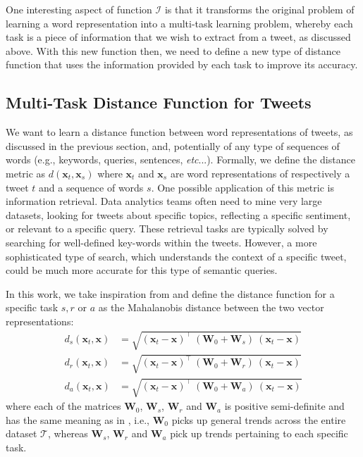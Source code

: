 \documentclass[letterpaper]{article}
\begin{document}
One interesting aspect of function $\mathcal{I}$ is that it transforms the original problem of learning a word representation into a multi-task learning problem, whereby each task is a piece of information that we wish to extract from a tweet, as discussed above. With this new function then, we need to define a new type of distance function that uses the information provided by each task to improve its accuracy.  

\subsection{Multi-Task Distance Function for Tweets}

We want to learn a distance function between word representations of tweets, as discussed in the previous section, and, potentially of any type of sequences of words (e.g., keywords, queries, sentences, \emph{etc}...). Formally, we define the distance metric as $d(\mathbf{x}_t, \mathbf{x}_s)$ where $\mathbf{x}_t$ and $\mathbf{x}_s$ are word representations of respectively a tweet $t$ and a sequence of words $s$. One possible application of this metric is information retrieval. Data analytics teams often need to mine very large datasets, looking for tweets about specific topics, reflecting a specific sentiment, or relevant to a specific query. These retrieval tasks are typically solved by searching for well-defined key-words within the tweets. However, a more sophisticated type of search, which understands the context of a specific tweet, could be much more accurate for this 
type of semantic queries. 

In this work, we take inspiration from \cite{Parameswaran2010a} and define the distance function for a specific task $s, r$ or $a$ as the Mahalanobis distance between the two vector representations: 
\begin{align}
d_{s} (\mathbf{x}_t, \mathbf{x}) &= \sqrt{  (\mathbf{x}_t - \mathbf{x})^{\intercal}\ (\mathbf{W}_0 + \mathbf{W}_s)\ (\mathbf{x}_t - \mathbf{x})}\label{eq:dist-1}\\
d_{r} (\mathbf{x}_t, \mathbf{x}) &= \sqrt{  (\mathbf{x}_t - \mathbf{x})^{\intercal}\ (\mathbf{W}_0 + \mathbf{W}_r)\ (\mathbf{x}_t - \mathbf{x})}\label{eq:dist-2}\\
d_{a} (\mathbf{x}_t, \mathbf{x}) &= \sqrt{  (\mathbf{x}_t - \mathbf{x})^{\intercal}\ (\mathbf{W}_0 + \mathbf{W}_a)\ (\mathbf{x}_t - \mathbf{x})}\label{eq:dist-3}
\end{align}
where each of the matrices $\mathbf{W}_0$, $\mathbf{W}_s$, $\mathbf{W}_r$ and $\mathbf{W}_a$ is positive semi-definite and has the same meaning as in \cite{Parameswaran2010a}, i.e., $\mathbf{W}_0$ picks up general trends across the entire dataset $\mathcal{T}$, whereas $\mathbf{W}_s$, $\mathbf{W}_r$ and $\mathbf{W}_a$ pick up trends pertaining to each specific task.  
\end{document}
